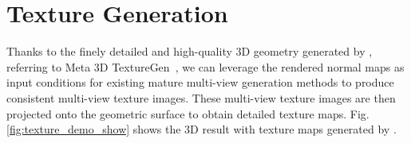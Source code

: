\section{Texture Generation}\label{sec:texture}
Thanks to the finely detailed and high-quality 3D geometry generated by \method{}, referring to Meta 3D TextureGen~\cite{bensadoun2024meta}, we can leverage the rendered normal maps as input conditions for existing mature multi-view generation methods to produce consistent multi-view texture images. These multi-view texture images are then projected onto the geometric surface to obtain detailed texture maps. 
Fig.\ref{fig:texture_demo_show} shows the 3D result with texture maps generated by \method{}.